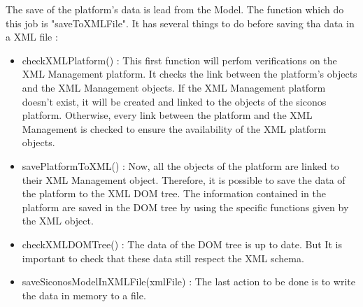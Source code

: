 The save of the platform's data is lead from the Model. The function which do this job is
"saveToXMLFile". It has several things to do before saving tha data in a XML file :
\begin{itemize}
        \item checkXMLPlatform() : This first function will perfom verifications on the XML Management platform. It checks the
        link between the platform's objects and the XML Management objects. If the XML Management
        platform doesn't exist, it will be created and linked to the objects of the \ac{siconos}
        platform. Otherwise, every link between the platform and the XML Management is checked to ensure
        the availability of the XML platform objects.
        \item savePlatformToXML() : Now, all the objects of the platform are linked to their XML Management object. Therefore,
        it is possible to save the data of the platform to the XML DOM tree. The information
        contained in the platform are saved in the DOM tree by using the specific functions given
        by the XML object.
        \item checkXMLDOMTree() : The data of the DOM tree is up to date. But It is important to check that these data still
        respect the XML schema. 
        \item saveSiconosModelInXMLFile(xmlFile) : The last action to be done is to write the data in memory to a file.
\end{itemize}
